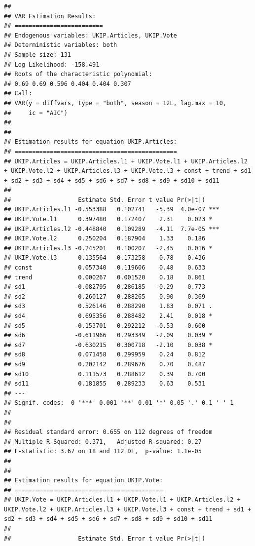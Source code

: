 \documentclass[12pt,article]{article}
\begin{document}
\begin{verbatim}
## 
## VAR Estimation Results:
## ========================= 
## Endogenous variables: UKIP.Articles, UKIP.Vote 
## Deterministic variables: both 
## Sample size: 131 
## Log Likelihood: -158.491 
## Roots of the characteristic polynomial:
## 0.69 0.69 0.596 0.404 0.404 0.307
## Call:
## VAR(y = diffvars, type = "both", season = 12L, lag.max = 10, 
##     ic = "AIC")
## 
## 
## Estimation results for equation UKIP.Articles: 
## ============================================== 
## UKIP.Articles = UKIP.Articles.l1 + UKIP.Vote.l1 + UKIP.Articles.l2 + UKIP.Vote.l2 + UKIP.Articles.l3 + UKIP.Vote.l3 + const + trend + sd1 + sd2 + sd3 + sd4 + sd5 + sd6 + sd7 + sd8 + sd9 + sd10 + sd11 
## 
##                   Estimate Std. Error t value Pr(>|t|)    
## UKIP.Articles.l1 -0.553388   0.102741   -5.39  4.0e-07 ***
## UKIP.Vote.l1      0.397480   0.172407    2.31    0.023 *  
## UKIP.Articles.l2 -0.448840   0.109289   -4.11  7.7e-05 ***
## UKIP.Vote.l2      0.250204   0.187904    1.33    0.186    
## UKIP.Articles.l3 -0.245201   0.100207   -2.45    0.016 *  
## UKIP.Vote.l3      0.135564   0.173258    0.78    0.436    
## const             0.057340   0.119606    0.48    0.633    
## trend             0.000267   0.001520    0.18    0.861    
## sd1              -0.082795   0.286185   -0.29    0.773    
## sd2               0.260127   0.288265    0.90    0.369    
## sd3               0.526146   0.288290    1.83    0.071 .  
## sd4               0.695356   0.288482    2.41    0.018 *  
## sd5              -0.153701   0.292212   -0.53    0.600    
## sd6              -0.611966   0.293349   -2.09    0.039 *  
## sd7              -0.630215   0.300718   -2.10    0.038 *  
## sd8               0.071458   0.299959    0.24    0.812    
## sd9               0.202142   0.289676    0.70    0.487    
## sd10              0.111573   0.288612    0.39    0.700    
## sd11              0.181855   0.289233    0.63    0.531    
## ---
## Signif. codes:  0 '***' 0.001 '**' 0.01 '*' 0.05 '.' 0.1 ' ' 1
## 
## 
## Residual standard error: 0.655 on 112 degrees of freedom
## Multiple R-Squared: 0.371,   Adjusted R-squared: 0.27 
## F-statistic: 3.67 on 18 and 112 DF,  p-value: 1.1e-05 
## 
## 
## Estimation results for equation UKIP.Vote: 
## ========================================== 
## UKIP.Vote = UKIP.Articles.l1 + UKIP.Vote.l1 + UKIP.Articles.l2 + UKIP.Vote.l2 + UKIP.Articles.l3 + UKIP.Vote.l3 + const + trend + sd1 + sd2 + sd3 + sd4 + sd5 + sd6 + sd7 + sd8 + sd9 + sd10 + sd11 
## 
##                   Estimate Std. Error t value Pr(>|t|)    

\end{verbatim}
\end{document}
